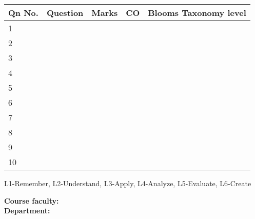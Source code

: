 \documentclass[12pt,a4paper]{article}
\begin{document}
\begin{table}[h!]
\begin{tabular}
{|p{}|p{}|p{}|p{}|p{}|}
\hline
\textbf{Qn No.}&\textbf{Question} &	\textbf{Marks}&\textbf{CO} &	\textbf{Blooms Taxonomy level} \\ \hline

1&&&&\\ \hline
2&&&&\\ \hline
3&&&&\\ \hline
4&&&&\\ \hline
5&&&&\\ \hline
6&&&&\\ \hline
7&&&&\\ \hline
8&&&&\\ \hline
9&&&&\\ \hline
10&&&&\\ \hline
\end{tabular}
L1-Remember, L2-Understand, L3-Apply, L4-Analyze, L5-Evaluate, L6-Create
\vspace{1em}


\textbf{Course faculty:} \\
\textbf{Department:}

\end{table}
\end{document}
